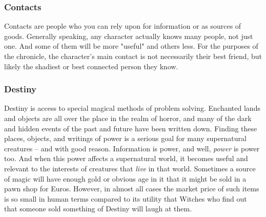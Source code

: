 \subsubsection{Contacts}

\hspace{\parindent} Contacts are people who you can rely upon for information or as sources of goods. Generally speaking, any character actually knows many people, not just one. And some of them will be more "useful" and others less. For the purposes of the chronicle, the character's main contact is not necessarily their best friend, but likely the shadiest or best connected person they know.

\subsubsection{Destiny}

\hspace{\parindent} Destiny is access to special magical methods of problem solving. Enchanted lands and objects are all over the place in the realm of horror, and many of the dark and hidden events of the past and future have been written down. Finding these places, objects, and writings of power is a serious goal for many supernatural creatures -- and with good reason. Information is power, and well, \textit{power} is power too. And when this power affects a supernatural world, it becomes useful and relevant to the interests of creatures that \textit{live} in that world. Sometimes a source of magic will have enough gold or obvious age in it that it might be sold in a pawn shop for Euros. However, in almost all cases the market price of such items is so small in human terms compared to its utility that Witches who find out that someone sold something of Destiny will laugh at them.

